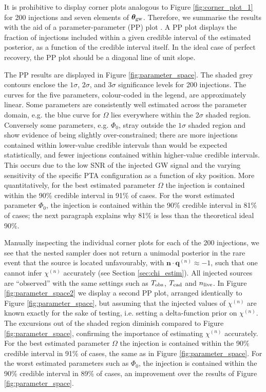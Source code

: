 \documentclass[fleqn,usenatbib,useAMS]{mnras}
\begin{document}
It is prohibitive to display corner plots analogous to Figure \ref{fig:corner_plot_1} for 200 injections and seven elements of $\boldsymbol{\theta}_{\rm gw}$. Therefore, we summarise the results with the aid of a parameter-parameter (PP) plot \citep{doi:10.1198/106186006X136976}. A PP plot displays the fraction of injections included within a given credible interval of the estimated posterior, as a function of the credible interval itself. In the ideal case of perfect recovery, the PP plot should be a diagonal line of unit slope. \newline 
 
The PP results are displayed in Figure \ref{fig:parameter_space}. The shaded grey contours enclose the $1\sigma$, $2\sigma$, and $3\sigma$ significance levels for 200 injections. The curves for the five parameters, colour-coded in the legend, are approximately linear. Some parameters are consistently well estimated across the parameter domain, e.g. the blue curve for $\Omega$ lies everywhere within the 2$\sigma$ shaded region. Conversely some parameters, e.g. $\Phi_0$, stray outside the $1\sigma$ shaded region and show evidence of being slightly over-constrained; there are more injections contained within lower-value credible intervals than would be expected statistically, and fewer injections contained within higher-value credible intervals. This occurs due to the low SNR of the injected GW signal and the varying sensitivity of the specific PTA configuration as a function of sky position. More quantitatively, for the best estimated parameter $\Omega$ the injection is contained within the 90\% credible interval in 91\% of cases. For the worst estimated parameter $\Phi_0$, the injection is contained within the 90\% credible interval in 81\% of cases; the next paragraph explains why 81\% is less than the theoretical ideal 90\%.  \newline 

Manually inspecting the individual corner plots for each of the 200 injections, we see that the nested sampler does not return a unimodal posterior in the rare event that the source is located unfavourably, with $\boldsymbol{n} \cdot \boldsymbol{q}^{(n)} \approx -1$, such that one cannot infer $\chi^{(n)}$ accurately (see Section \ref{sec:chi_estim}). All injected sources are ``observed'' with the same settings such as $T_{\rm obs}$, $T_{\rm cad}$ and $n_{\rm live}$. In Figure \ref{fig:parameter_space2} we display a second PP plot, arranged identically to Figure \ref{fig:parameter_space}, but assuming that the injected values of $\chi^{(n)}$ are known exactly for the sake of testing, i.e. setting a delta-function prior on $\chi^{(n)}$. The excursions out of the shaded region diminish compared to Figure \ref{fig:parameter_space}, confirming the importance of estimating $\chi^{(n)}$ accurately. For the best estimated parameter $\Omega$ the injection is contained within the 90\% credible interval in 91\% of cases, the same as in Figure \ref{fig:parameter_space}. For the worst estimated parameters such as $\Phi_0$, the injection is contained within the 90\% credible interval in 89\% of cases, an improvement over the results of Figure \ref{fig:parameter_space}. \newline 
\end{document}
